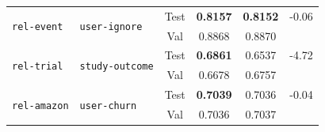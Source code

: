\documentclass{article} %
\begin{document}
\begin{table}[!t]
{\begin{tabular}{llcc|cc}
\midrule
\multirow{2}{*}{\texttt{rel-event}} & \multirow{2}{*}{\texttt{user-ignore}} & Test & \textbf{0.8157} & \textbf{0.8152} & \cellcolor{mediumred}-0.06 \\ & & Val & 0.8868 & 0.8870 \\

\midrule
\multirow{2}{*}{\texttt{rel-trial}} & \multirow{2}{*}{\texttt{study-outcome}} & Test & \textbf{0.6861} & 0.6537 & \cellcolor{mediumred}-4.72 \\ & & Val & 0.6678 &  0.6757 \\

\midrule
\multirow{2}{*}{\texttt{rel-amazon}} & \multirow{2}{*}{\texttt{user-churn}} & Test & \textbf{0.7039} &  0.7036 & \cellcolor{mediumred}-0.04 \\ & & Val & 0.7036 &  0.7037 \\


\bottomrule
\end{tabular}
}
\end{table}
\end{document}
